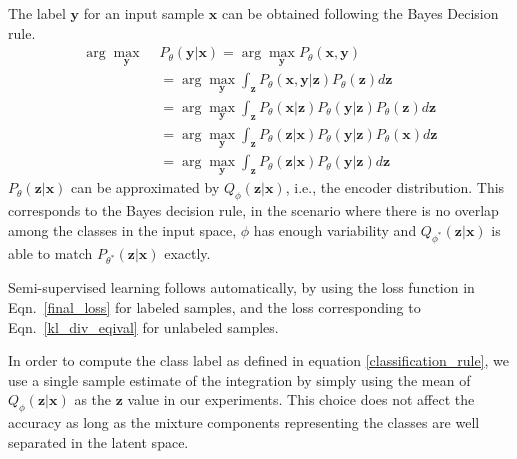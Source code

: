 \documentclass[letterpaper]{article} %
\begin{document}
The label $\mathbf{y}$ for an input sample $\mathbf{x}$ can be obtained following the Bayes Decision rule.
\begin{equation}
\begin{split}
\arg\max_{\mathbf{y}}\,\, & P_{\theta}(\mathbf{y}|\mathbf{x}) = \arg\max_{\mathbf{y}} P_{\theta}(\mathbf{x,y})\\
&= \arg\max_{\mathbf{y}} \int_{\mathbf{z}} P_{\theta}(\mathbf{x,y}|\mathbf{z})P_{\theta}(\mathbf{z})d\mathbf{z} \\
&= \arg\max_{\mathbf{y}} \int_{\mathbf{z}} P_{\theta}(\mathbf{x}|\mathbf{z})P_{\theta}(\mathbf{y}|\mathbf{z})P_{\theta}(\mathbf{z})d\mathbf{z} \\
&= \arg\max_{\mathbf{y}} \int_{\mathbf{z}} P_{\theta}(\mathbf{z}|\mathbf{x})P_{\theta}(\mathbf{y}|\mathbf{z})P_{\theta}(\mathbf{x})d\mathbf{z} \\
&= \arg\max_{\mathbf{y}} \int_{\mathbf{z}} P_{\theta}(\mathbf{z}|\mathbf{x})P_{\theta}(\mathbf{y}|\mathbf{z})d\mathbf{z}
\end{split}
\label{classification_rule}
\end{equation}
$P_{\theta}(\mathbf{z}|\mathbf{x})$ can be approximated by $Q_{\phi}(\mathbf{z}|\mathbf{x})$, i.e., the encoder distribution. This corresponds to the Bayes decision rule, in the scenario where there is no overlap among the classes in the input space, $\phi$ has enough variability and $Q_{\phi^*}(\mathbf{z}|\mathbf{x})$ is able to match $P_{\theta^*}(\mathbf{z}|\mathbf{x})$ exactly.

Semi-supervised learning follows automatically, by using the loss function in Eqn.~\ref{final_loss} for labeled samples, and the loss corresponding to Eqn.~\ref{kl_div_eqival} for unlabeled samples.

In order to compute the class label as defined in equation \ref{classification_rule}, we use a single sample estimate of the integration by simply using the mean of $Q_\phi(\mathbf{z}|\mathbf{x})$ as the $\mathbf{z}$ value in our experiments. This choice does not affect the accuracy as long as the mixture components representing the classes are well separated in the latent space.
\end{document}
